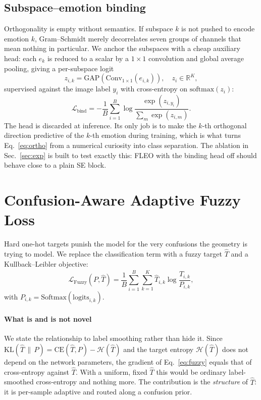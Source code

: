 \documentclass[journal]{IEEEtran}
\begin{document}
\subsection{Subspace--emotion binding}\label{sec:binding}
Orthogonality is empty without semantics. If subspace $k$ is not pushed to
encode emotion $k$, Gram--Schmidt merely decorrelates seven groups of channels
that mean nothing in particular. We anchor the subspaces with a cheap
auxiliary head: each $e_k$ is reduced to a scalar by a $1\times1$ convolution
and global average pooling, giving a per-subspace logit
\begin{equation}
z_{i,k}=\text{GAP}\!\left(\text{Conv}_{1\times1}(e_{i,k})\right),
\quad z_i\in\mathbb{R}^{K},
\end{equation}
supervised against the image label $y_i$ with cross-entropy on
$\text{softmax}(z_i)$:
\begin{equation}\label{eq:bind}
\mathcal{L}_\text{bind} = -\frac{1}{B}\sum_{i=1}^{B}
\log\frac{\exp(z_{i,y_i})}{\sum_m\exp(z_{i,m})}.
\end{equation}
The head is discarded at inference. Its only job is to make the $k$-th
orthogonal direction predictive of the $k$-th emotion during training, which
is what turns Eq.~\eqref{eq:ortho} from a numerical curiosity into class
separation. The ablation in Sec.~\ref{sec:exp} is built to test exactly this:
FLEO with the binding head off should behave close to a plain SE block.

\section{Confusion-Aware Adaptive Fuzzy Loss}\label{sec:fuzzy}
Hard one-hot targets punish the model for the very confusions the geometry is
trying to model. We replace the classification term with a fuzzy target
$\hat{T}$ and a Kullback--Leibler objective:
\begin{equation}\label{eq:fuzzy}
\mathcal{L}_\text{Fuzzy}(P,\hat{T}) = \frac{1}{B}\sum_{i=1}^{B}\sum_{k=1}^{K}
\hat{T}_{i,k}\log\frac{\hat{T}_{i,k}}{P_{i,k}},
\end{equation}
with $P_{i,k}=\text{Softmax}(\text{logits}_{i,k})$.

\paragraph*{What is and is not novel}
We state the relationship to label smoothing rather than hide it. Since
$\mathrm{KL}(\hat{T}\,\|\,P)=\mathrm{CE}(\hat{T},P)-\mathcal{H}(\hat{T})$ and
the target entropy $\mathcal{H}(\hat{T})$ does not depend on the network
parameters, the gradient of Eq.~\eqref{eq:fuzzy} equals that of cross-entropy
against $\hat{T}$. With a uniform, fixed $\hat{T}$ this would be ordinary
label-smoothed cross-entropy and nothing more. The contribution is the
\emph{structure} of $\hat{T}$: it is per-sample adaptive and routed along a
confusion prior.
\end{document}
